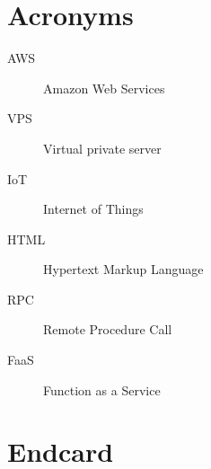 \documentclass[../main.tex]{subfiles}
\begin{document}
\chapter{Acronyms}

\begin{description}
  \item[AWS] Amazon Web Services
  \item[VPS] Virtual private server
  \item[IoT] Internet of Things
  \item[HTML] Hypertext Markup Language
  \item[RPC] Remote Procedure Call
  \item[FaaS] Function as a Service
\end{description}

\chapter{Endcard}
\end{document}
